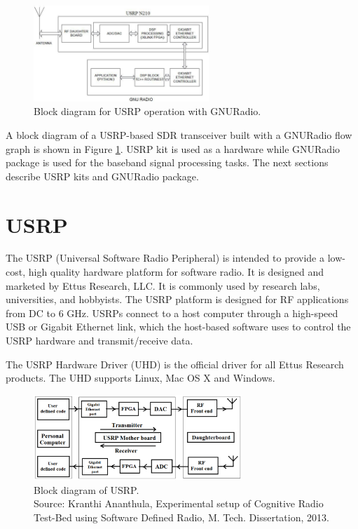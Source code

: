 \begin{figure}
\centering
\includegraphics[width=0.59\textwidth]{usrpGNURadioBlock}
\caption{Block diagram for USRP operation with GNURadio.}
\label{usrpGNURadioBlock}
\end{figure}

A block diagram of a USRP-based SDR transceiver built with a GNURadio flow 
graph is shown in Figure \ref{usrpGNURadioBlock}. USRP kit is used as a
hardware while GNURadio
package is used for the baseband signal processing tasks. The next sections
describe USRP kits and GNURadio package.

\section{USRP}

The USRP (Universal Software Radio Peripheral) is intended to provide a 
low-cost, high quality hardware platform for software radio. It is designed
and marketed by Ettus Research, LLC. It is commonly used by research labs,
universities, and hobbyists. The USRP platform is designed for RF applications
from DC to 6 GHz. USRPs connect to a host computer through a high-speed USB or
Gigabit Ethernet link, which the host-based software uses to control the USRP
hardware and transmit/receive data.

The USRP Hardware Driver (UHD) is the official driver for all Ettus Research
products. The UHD supports Linux, Mac OS X and Windows.

\begin{figure}
\centering
\includegraphics[width=0.7\textwidth]{usrpBlock}
\caption[Block diagram of USRP]{Block diagram of USRP.\\
\footnotesize{Source: Kranthi Ananthula, Experimental setup of Cognitive Radio 
Test-Bed using Software Defined Radio, M. Tech. Dissertation, 2013.}}
\label{usrpBlock}
\end{figure}

